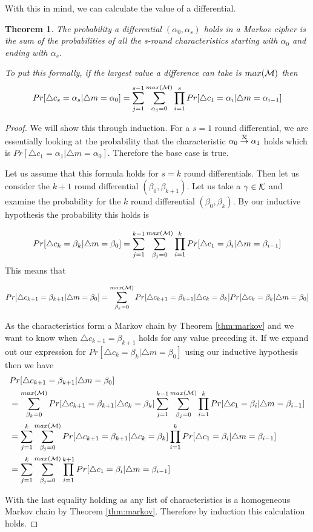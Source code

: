 \documentclass[12pt,a4paper]{article}
\newtheorem{theorem}{Theorem}
\newcommand{\differ}[1] {\overset{#1}{\rightarrow}}
\begin{document}
With this in mind, we can calculate the value of a differential.
\begin{theorem}
The probability a differential $(\alpha_0, \alpha_s)$ holds in a Markov cipher is the sum of the
probabilities of all the s-round characteristics starting with $\alpha_0$ and
ending with $\alpha_s$. 

To put this formally, if the largest value a difference can take is
$max(\cal{M})$ then
\[Pr[\triangle c_s = \alpha_s | \triangle m = \alpha_0] =
\sum_{j=1}^{s-1}\sum_{\alpha_j =
0}^{max({\cal{M}})} \prod_{i=1}^s
Pr[\triangle c_1 = \alpha_i | \triangle m = \alpha_{i-1}] \]
\end{theorem}
\begin{proof}
We will show this through induction. For a $s=1$ round differential, we are
essentially looking at the probability that the characteristic $\alpha_0
\differ{\cal{R}} \alpha_1$ holds which is $Pr[\triangle c_1 = \alpha_1 |
\triangle m = \alpha_0]$. Therefore the base case is true.

Let us assume that this formula holds for $s=k$ round differentials. Then let us
consider the $k+1$ round differential $(\beta_0,\beta_{k+1})$. Let us take a
$\gamma \in \cal{K}$ and examine the probability for the $k$ round differential
$(\beta_0,\beta_k)$. By our inductive hypothesis the probability this holds is

\[Pr[\triangle c_k = \beta_k | \triangle m = \beta_0] =
\sum_{j=1}^{k-1}\sum_{\beta_j =
0}^{max({\cal{M}})} \prod_{i=1}^k
Pr[\triangle c_1 = \beta_i | \triangle m = \beta_{i-1}] \]
This means that 

\[Pr[\triangle c_{k+1} = \beta_{k+1} | \triangle m = \beta_0] =
\sum_{\beta_k=0}^{max(\cal{M})} Pr[\triangle c_{k+1} = \beta_{k+1}| \triangle
c_k = \beta_k] Pr[\triangle c_k = \beta_{k}  | \triangle m = \beta_0]\]

As the characteristics form a Markov chain by Theorem \ref{thm:markov} and we
want to know when $\triangle c_{k+1} = \beta_{k+1}$ holds for any value
preceding it. If we expand out our expression for $Pr[\triangle c_k = \beta_k
| \triangle m = \beta_0]$ using our inductive hypothesis then we have
\begin{align*}
&Pr[\triangle c_{k+1} = \beta_{k+1} | \triangle m = \beta_0] \\
&= 
\sum_{\beta_k=0}^{max(\cal{M})} Pr[\triangle c_{k+1} = \beta_{k+1}| \triangle
c_k = \beta_k] \sum_{j=1}^{k-1}\sum_{\beta_j = 0}^{max({\cal{M}})}
\prod_{i=1}^k Pr[\triangle c_1 = \beta_i | \triangle m = \beta_{i-1}] \\
&= 
\sum_{j=1}^{k}\sum_{\beta_j = 0}^{max({\cal{M}})} Pr[\triangle c_{k+1} = \beta_{k+1}| \triangle
c_k = \beta_k] 
\prod_{i=1}^k Pr[\triangle c_1 = \beta_i | \triangle m = \beta_{i-1}] \\
&= 
\sum_{j=1}^{k}\sum_{\beta_j = 0}^{max({\cal{M}})} \prod_{i=1}^{k+1} Pr[\triangle c_1 = \beta_i | \triangle m = \beta_{i-1}] 
\end{align*}

With the last equality holding as any list of characteristics is a homogeneous
Markov chain by Theorem \ref{thm:markov}. Therefore by induction this
calculation holds.
\end{proof}
\end{document}
